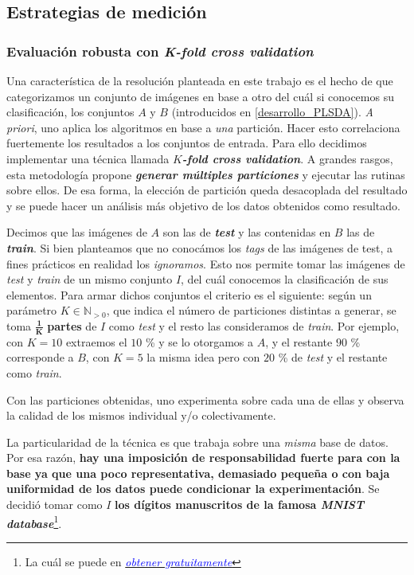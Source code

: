 \subsection{Estrategias de medici\'on}

\subsubsection{Evaluaci\'on robusta con \textit{K-fold cross validation}}

Una caracter\'istica de la resoluci\'on planteada en este trabajo es el hecho de que categorizamos un conjunto de im\'agenes en base a otro del cu\'al si conocemos su clasificaci\'on, los conjuntos $A$ y $B$ (introducidos en \ref{desarrollo_PLSDA}). \textit{A priori}, uno aplica los algoritmos en base a \textit{una} partici\'on. Hacer esto correlaciona fuertemente los resultados a los conjuntos de entrada. Para ello decidimos implementar una t\'ecnica llamada \textbf{\textit{$\mathbf{\mathit{K}}$-fold cross validation}}. A grandes rasgos, esta metodolog\'ia propone \textbf{\textit{generar m\'ultiples particiones}} y ejecutar las rutinas sobre ellos. De esa forma, la elecci\'on de partici\'on queda desacoplada del resultado y se puede hacer un an\'alisis m\'as objetivo de los datos obtenidos como resultado.

Decimos que las im\'agenes de $A$ son las de \textbf{\textit{test}} y las contenidas en $B$ las de \textit{\textbf{train}}. Si bien planteamos que no conoc\'amos los \textit{tags} de las im\'agenes de test, a fines pr\'acticos en realidad los \textit{ignoramos}. Esto nos permite tomar las im\'agenes de \textit{test} y \textit{train} de un mismo conjunto $I$, del cu\'al conocemos la clasificaci\'on de sus elementos. Para armar dichos conjuntos el criterio es el siguiente: seg\'un un par\'ametro $K \in \mathbb{N}_{> 0}$, que indica el n\'umero de particiones distintas a generar, se toma $\mathbf{\frac{1}{K}}$ \textbf{partes} de $I$ como \textit{test} y el resto las consideramos de \textit{train}. Por ejemplo, con $K = 10$ extraemos el $10$ \% y se lo otorgamos a $A$, y el restante $90$ \% corresponde a $B$, con $K = 5$ la misma idea pero con $20$ \% de \textit{test} y el restante como \textit{train}.

Con las particiones obtenidas, uno experimenta sobre cada una de ellas y observa la calidad de los mismos individual y/o colectivamente.

La particularidad de la t\'ecnica es que trabaja sobre una \textit{misma} base de datos. Por esa raz\'on, \textbf{hay una imposici\'on de responsabilidad fuerte para con la base ya que una poco representativa, demasiado pequeña o con baja uniformidad de los datos puede condicionar la experimentaci\'on}. Se decidi\'o tomar como $I$ \textbf{los d\'igitos manuscritos de la famosa \textit{MNIST database}}\footnote{La cu\'al se puede en \href{https://www.kaggle.com/c/digit-recognizer/data}{\textit{\textcolor{blue}{obtener gratuitamente}}}}.

